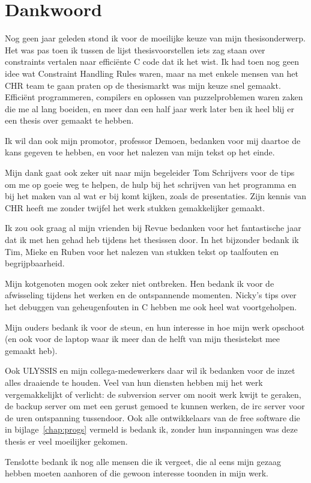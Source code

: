 \section*{Dankwoord}

Nog geen jaar geleden stond ik voor de moeilijke keuze van mijn thesisonderwerp. Het was pas toen ik tussen de lijst thesisvoorstellen iets zag staan over constraints vertalen naar effici\"ente C code dat ik het wist. Ik had toen nog geen idee wat Constraint Handling Rules waren, maar na met enkele mensen van het CHR team te gaan praten op de thesismarkt was mijn keuze snel gemaakt. Effici\"ent programmeren, compilers en oplossen van puzzelproblemen waren zaken die me al lang boeiden, en meer dan een half jaar werk later ben ik heel blij er een thesis over gemaakt te hebben.

Ik wil dan ook mijn promotor, professor Demoen, bedanken voor mij daartoe de kans gegeven te hebben, en voor het nalezen van mijn tekst op het einde.

Mijn dank gaat ook zeker uit naar mijn begeleider Tom Schrijvers voor de tips om me op goeie weg te helpen, de hulp bij het schrijven van het programma en bij het maken van al wat er bij komt kijken, zoals de presentaties. Zijn kennis van CHR heeft me zonder twijfel het werk stukken gemakkelijker gemaakt.

Ik zou ook graag al mijn vrienden bij Revue bedanken voor het fantastische jaar dat ik met hen gehad heb tijdens het thesissen door. In het bijzonder bedank ik Tim, Mieke en Ruben voor het nalezen van stukken tekst op taalfouten en begrijpbaarheid.

Mijn kotgenoten mogen ook zeker niet ontbreken. Hen bedank ik voor de afwisseling tijdens het werken en de ontspannende momenten. Nicky's tips over het debuggen van geheugenfouten in C hebben me ook heel wat voortgeholpen.

Mijn ouders bedank ik voor de steun, en hun interesse in hoe mijn werk opschoot (en ook voor de laptop waar ik meer dan de helft van mijn thesistekst mee gemaakt heb).

Ook ULYSSIS en mijn collega-medewerkers daar wil ik bedanken voor de inzet alles draaiende te houden. Veel van hun diensten hebben mij het werk vergemakkelijkt of verlicht: de subversion server om nooit werk kwijt te geraken, de backup server om met een gerust gemoed te kunnen werken, de irc server voor de uren ontspanning tussendoor. Ook alle ontwikkelaars van de free software die in bijlage~\ref{chap:progs} vermeld is bedank ik, zonder hun inspanningen was deze thesis er veel moeilijker gekomen.

Tenslotte bedank ik nog alle mensen die ik vergeet, die al eens mijn gezaag hebben moeten aanhoren of die gewoon interesse toonden in mijn werk.